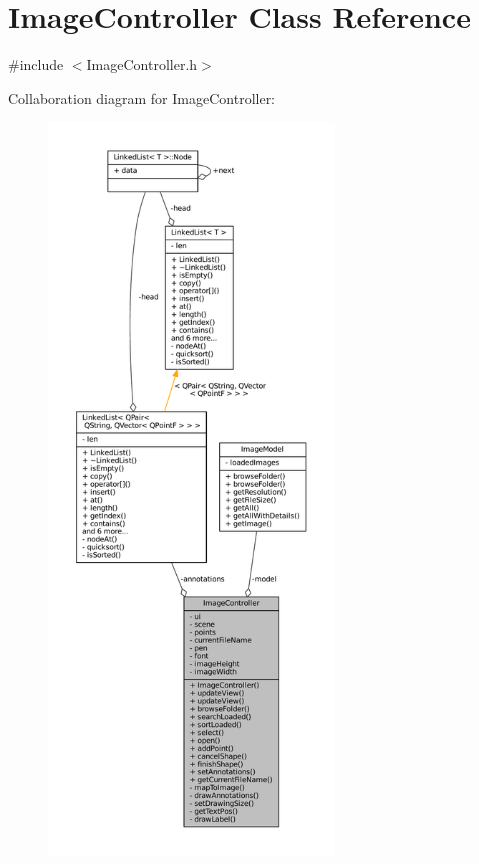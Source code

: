 \hypertarget{classImageController}{}\section{Image\+Controller Class Reference}
\label{classImageController}


{\ttfamily \#include $<$Image\+Controller.\+h$>$}



Collaboration diagram for Image\+Controller\+:
\nopagebreak
\begin{figure}[H]
\begin{center}
\leavevmode
\includegraphics[height=550pt]{classImageController__coll__graph}
\end{center}
\end{figure}
